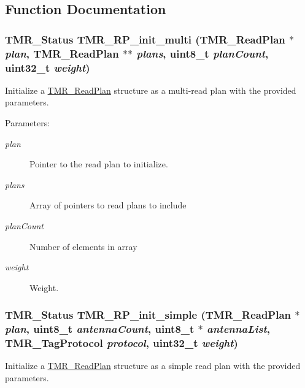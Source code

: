 \subsection{Function Documentation}
\hypertarget{group__readplan_gce3c98ef5a04cfcac4b14e0fff950988}{
\subsubsection[{TMR\_\-RP\_\-init\_\-multi}]{\setlength{\rightskip}{0pt plus 5cm}TMR\_\-Status TMR\_\-RP\_\-init\_\-multi ({\bf TMR\_\-ReadPlan} $\ast$ {\em plan}, \/  {\bf TMR\_\-ReadPlan} $\ast$$\ast$ {\em plans}, \/  uint8\_\-t {\em planCount}, \/  uint32\_\-t {\em weight})}}
\label{group__readplan_gce3c98ef5a04cfcac4b14e0fff950988}


Initialize a \hyperlink{struct_t_m_r___read_plan}{TMR\_\-ReadPlan} structure as a multi-read plan with the provided parameters.

\begin{Desc}
\item[Parameters:]
\begin{description}
\item[{\em plan}]Pointer to the read plan to initialize. \item[{\em plans}]Array of pointers to read plans to include \item[{\em planCount}]Number of elements in array \item[{\em weight}]Weight. \end{description}
\end{Desc}
\hypertarget{group__readplan_g1af189d2675156c9a068367219fa3d98}{
\subsubsection[{TMR\_\-RP\_\-init\_\-simple}]{\setlength{\rightskip}{0pt plus 5cm}TMR\_\-Status TMR\_\-RP\_\-init\_\-simple ({\bf TMR\_\-ReadPlan} $\ast$ {\em plan}, \/  uint8\_\-t {\em antennaCount}, \/  uint8\_\-t $\ast$ {\em antennaList}, \/  {\bf TMR\_\-TagProtocol} {\em protocol}, \/  uint32\_\-t {\em weight})}}
\label{group__readplan_g1af189d2675156c9a068367219fa3d98}


Initialize a \hyperlink{struct_t_m_r___read_plan}{TMR\_\-ReadPlan} structure as a simple read plan with the provided parameters.

